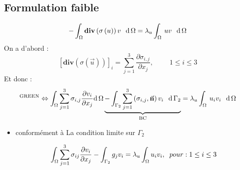 \documentclass[french]{beamer}
\begin{document}
\subsection{Formulation faible}
\begin{frame}
  \begin{equation}
    - \int_\Omega \mathbf{div}  \left( \sigma \left(u\right) \right) v \hspace{7pt} \mathop{\!\mathrm{d}} \Omega 
    = \lambda_u\int_\Omega  \hspace{2pt} u v \hspace{7pt} \mathop{\!\mathrm{d}} \Omega
  \end{equation}
  \pause
  On a d'abord :
  \begin{equation*}
    \left[\mathbf{div}  \left( \sigma \left(\vec{u}\right) \right)\right]_i = 
    \sum_{j=1}^3 \frac{\partial\sigma_{i,j}}{\partial x_j}, \hspace{28pt}  \boxed{1 \leq i \leq 3}
      \end{equation*}
  \pause
  \vspace{10pt}
  Et donc : 
  \begin{equation}
    ^{\mathrm{GREEN}}\Leftrightarrow
      \int_\Omega \sum_{j=1}^3 \sigma_{i,j} \frac{\partial v_i}{\partial x_j} \mathop{\!\mathrm{d}} \Omega 
      \underbrace{- \int_{\Gamma_{2}} \sum_{j=1}^3 \left(\sigma_{i,j}, \vec{\mathbf{n}} \right) v_i \hspace{7pt} 
       \mathop{\!\mathrm{d}} {\Gamma_{2}}}_{\mathrm{BC}}
    = \lambda_u \int_\Omega  \hspace{2pt} u_i v_i \hspace{7pt} \mathop{\!\mathrm{d}} \Omega
  \end{equation}
 \end{frame}
\begin{frame}
 \begin{itemize}
 \item conformément à La condition limite sur $\Gamma_{2}$

$$\int_{\Omega}\sum_{j=1}^{3}\sigma_{ij}\frac{\partial v_{i}}{\partial x_{j}} - \int_{\Gamma_{2}}g_{j}v_{i}  = \lambda_u\int_{\Omega} u_{i}v_{i},\hspace{0.2cm} pour : 1\leq i \leq 3$$ 
     \end{itemize}

\end{frame}
\end{document}
